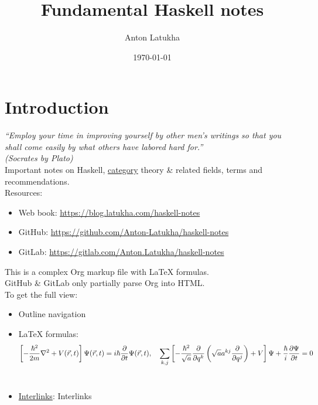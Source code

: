 \documentclass[11pt]{article}
\author{Anton Latukha}
\date{\today}
\title{Fundamental Haskell notes}
\begin{document}
\maketitle
\setcounter{tocdepth}{10}
\tableofcontents

\tableofcontents

\section{Introduction}
\label{sec:org521b4c3}

\emph{“Employ your time in improving yourself by other men's writings so that you shall come easily by what others have labored hard for.”\\
(Socrates by Plato)}\\

Important notes on Haskell, \hyperref[org3e3a79b]{category} theory \& related fields, terms and recommendations.\\

Resources:\\
\begin{itemize}
\item Web book: \url{https://blog.latukha.com/haskell-notes}\\
\item GitHub: \url{https://github.com/Anton-Latukha/haskell-notes}\\
\item GitLab: \url{https://gitlab.com/Anton.Latukha/haskell-notes}\\
\end{itemize}

This is a complex Org markup file with \LaTeX{} formulas.\\
GitHub \& GitLab only partially parse Org into HTML.\\

To get the full view:\\
\begin{itemize}
\item Outline navigation\\
\item \LaTeX{} formulas: $$ {\displaystyle\left[{-\frac{\hbar^{2}}{2m}}\nabla^{2}+V(\vec{r},t)\right]\Psi({\vec{r}},t)=i\hbar{\partial\over\partial{t}}\Psi({\vec{r}},t),\quad\sum_{k,j}\left[-{\frac{\hbar^{2}}{\sqrt{a}}}{\frac{\partial}{\partial{q^{k}}}}\left({\sqrt{a}}a^{kj}{\frac{\partial}{\partial{q^{j}}}}\right)+V\right]\Psi+{\frac{\hbar}{i}}{\frac{\partial{\Psi}}{\partial{t}}}=0} $$\\
\item \hyperref[orga7f9abd]{Interlinks}: \label{orga7f9abd}Interlinks\\
\end{itemize}
\end{document}
